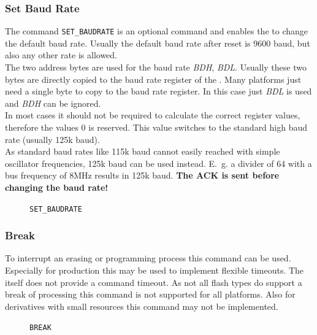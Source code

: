 \subsubsection{Set Baud Rate}
\label{sec:CmdSetBaudRate}
The command \texttt{SET_BAUDRATE} is an optional command and enables the \fp{} to change the default baud rate. Usually the default baud rate after reset is 9600 baud, but also any other rate is allowed.\\
The two address bytes are used for the baud rate \emph{BDH}, \emph{BDL}. Usually these two bytes are directly copied to the baud rate register of the \uc{}. Many platforms just need a single byte to copy to the baud rate register. In this case just \emph{BDL} is used and \emph{BDH} can be ignored.\\
In most cases it should not be required to calculate the correct register values, therefore the values $0$ is reserved. This value switches to the standard high baud rate (usually 125k baud).\\
As standard baud rates like 115k baud cannot easily reached with simple oscillator frequencies, 125k baud can be used instead. E.~g. a divider of 64 with a bus frequency of 8MHz results in 125k baud. \textbf{The ACK is sent before changing the baud rate!}
 
\begin{figure}[h]
\begin{center}
\caption{\texttt{SET_BAUDRATE}}
\label{fig:CmdSetBaudRate}
\end{center}
\end{figure}
\newpage
\subsubsection{Break}
\label{sec:CmdBreak}
To interrupt an erasing or programming process this command can be used. Especially for production this may be used to implement flexible timeouts. The \bl{} itself does not provide a command timeout. As not all flash types do support a break of processing this command is not supported for all platforms. Also for derivatives with small resources this command may not be implemented.
 
\begin{figure}[h]
\begin{center}
\caption{\texttt{BREAK}}
\label{fig:CmdBreak}
\end{center}
\end{figure}



